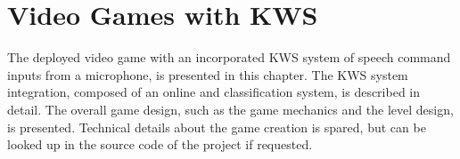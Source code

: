 
\chapter{Video Games with KWS}\label{sec:game}
The deployed video game with an incorporated KWS system of speech command inputs from a microphone, is presented in this chapter.
The KWS system integration, composed of an online and classification system, is described in detail.
The overall game design, such as the game mechanics and the level design, is presented.
Technical details about the game creation is spared, but can be looked up in the source code of the project \cite{KWSGame} if requested.



